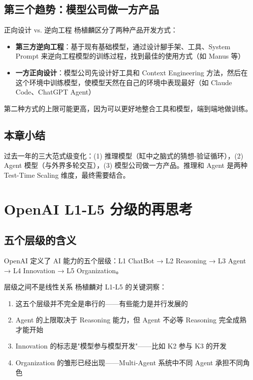 \documentclass[a4paper]{article}
\begin{document}
\subsection{第三个趋势：模型公司做一方产品}

\begin{importantbox}{正向设计 vs. 逆向工程}
杨植麟区分了两种产品开发方式：
\begin{itemize}
    \item \textbf{第三方逆向工程}：基于现有基础模型，通过设计腳手架、工具、System Prompt 来逆向工程模型的训练过程，找到最佳的使用方式（如 Manus 等）
    \item \textbf{一方正向设计}：模型公司先设计好工具和 Context Engineering 方法，然后在这个环境中训练模型，使模型天然在自己的环境中表现最好（如 Claude Code、ChatGPT Agent）
\end{itemize}
第二种方式的上限可能更高，因为可以更好地整合工具和模型，端到端地做训练。
\end{importantbox}

\subsection{本章小结}

过去一年的三大范式级变化：(1) 推理模型（缸中之脑式的猜想-验证循环），(2) Agent 模型（与外界多轮交互），(3) 模型公司做一方产品。推理和 Agent 是两种 Test-Time Scaling 维度，最终需要结合。


\section{OpenAI L1-L5 分级的再思考}

\subsection{五个层级的含义}

OpenAI 定义了 AI 能力的五个层级：L1 ChatBot → L2 Reasoning → L3 Agent → L4 Innovation → L5 Organization。

\begin{importantbox}{层级之间不是线性关系}
杨植麟对 L1-L5 的关键洞察：
\begin{enumerate}
    \item 这五个层级并不完全是串行的——有些能力是并行发展的
    \item Agent 的上限取决于 Reasoning 能力，但 Agent 不必等 Reasoning 完全成熟才能开始
    \item Innovation 的标志是"模型参与模型开发"——比如 K2 参与 K3 的开发
    \item Organization 的雏形已经出现——Multi-Agent 系统中不同 Agent 承担不同角色
\end{enumerate}
\end{importantbox}
\end{document}
